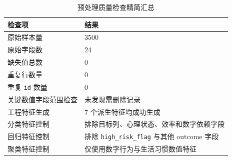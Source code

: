 \begin{table}[H]
\centering
\caption{预处理质量检查精简汇总}
\label{tab:preprocessing-quality-check}
\begin{tabular}{ll}
\toprule
检查项 & 结果 \\
\midrule
原始样本量 & 3500 \\
原始字段数 & 24 \\
缺失值总数 & 0 \\
重复行数量 & 0 \\
重复 \texttt{id} 数量 & 0 \\
关键数值字段范围检查 & 未发现需删除记录 \\
工程特征生成 & 7 个派生特征均成功生成 \\
分类特征控制 & 排除目标列、心理状态、效率和数字依赖字段 \\
回归特征控制 & 排除 \texttt{high\_risk\_flag} 与其他 outcome 字段 \\
聚类特征控制 & 仅使用数字行为与生活习惯数值特征 \\
\bottomrule
\end{tabular}
\end{table}
